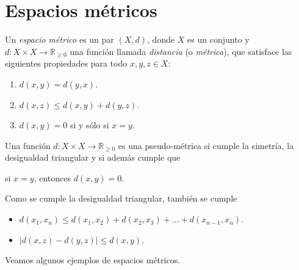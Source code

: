 \section{Espacios métricos}

\begin{definition}
    Un \emph{espacio métrico} es un par $(X, d)$, donde $X$ es un conjunto y $d: X \times X \to \mathbb{R}_{\geq 0}$ una función llamada \emph{distancia} (o \emph{métrica}), que satisface las siguientes propiedades para todo $x, y, z \in X$:
    \begin{enumerate}
        \item $d(x, y) = d(y, x)$.
        \item $d(x, z) \le d(x, y) + d(y, z)$.
        \item $d(x, y) = 0$ si y sólo si $x = y$.
    \end{enumerate}
\end{definition}

Una función $d: X \times X \to \mathbb{R}_{\geq 0}$ es una pseudo-métrica si cumple la simetría, la desigualdad triangular y si además cumple que
\begin{center}
    si $x = y$, entonces $d(x, y) = 0$.
\end{center}

\begin{remark}
    Como se cumple la desigualdad triangular, también se cumple
    \begin{itemize}
        \item $d(x_{1}, x_{n}) \leq d(x_{1}, x_{2}) + d(x_{2}, x_{3}) + \dots + d(x_{n-1}, x_{n})$.
        \item $\lvert d(x, z) - d(y, z) \rvert \leq d(x, y)$.
    \end{itemize}
\end{remark}

Veamos algunos ejemplos de espacios métricos.

